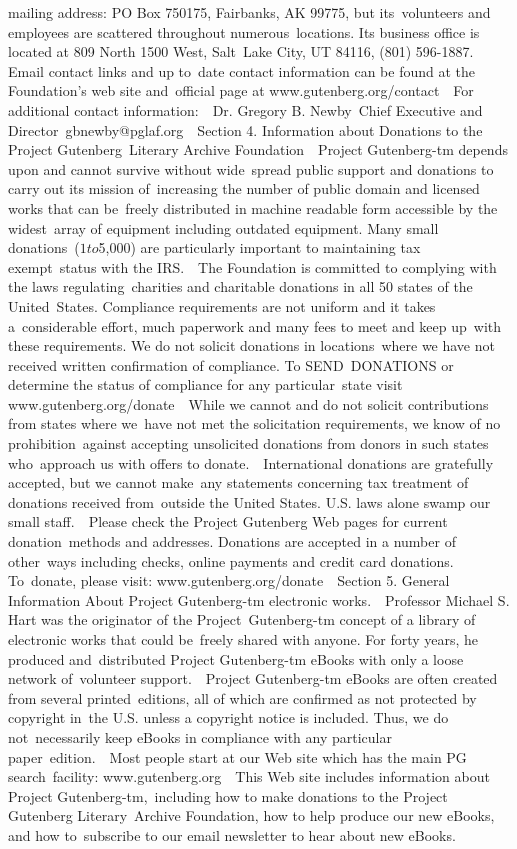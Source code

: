{mailing address: PO Box 750175, Fairbanks, AK 99775, but its\
volunteers and employees are scattered throughout numerous\
locations. Its business office is located at 809 North 1500 West, Salt\
Lake City, UT 84116, (801) 596-1887. Email contact links and up to\
date contact information can be found at the Foundation's web site and\
official page at www.gutenberg.org/contact\
\
For additional contact information:\
\
    Dr. Gregory B. Newby\
    Chief Executive and Director\
    gbnewby@pglaf.org\
\
Section 4. Information about Donations to the Project Gutenberg\
Literary Archive Foundation\
\
Project Gutenberg-tm depends upon and cannot survive without wide\
spread public support and donations to carry out its mission of\
increasing the number of public domain and licensed works that can be\
freely distributed in machine readable form accessible by the widest\
array of equipment including outdated equipment. Many small donations\
($1 to $5,000) are particularly important to maintaining tax exempt\
status with the IRS.\
\
The Foundation is committed to complying with the laws regulating\
charities and charitable donations in all 50 states of the United\
States. Compliance requirements are not uniform and it takes a\
considerable effort, much paperwork and many fees to meet and keep up\
with these requirements. We do not solicit donations in locations\
where we have not received written confirmation of compliance. To SEND\
DONATIONS or determine the status of compliance for any particular\
state visit www.gutenberg.org/donate\
\
While we cannot and do not solicit contributions from states where we\
have not met the solicitation requirements, we know of no prohibition\
against accepting unsolicited donations from donors in such states who\
approach us with offers to donate.\
\
International donations are gratefully accepted, but we cannot make\
any statements concerning tax treatment of donations received from\
outside the United States. U.S. laws alone swamp our small staff.\
\
Please check the Project Gutenberg Web pages for current donation\
methods and addresses. Donations are accepted in a number of other\
ways including checks, online payments and credit card donations. To\
donate, please visit: www.gutenberg.org/donate\
\
Section 5. General Information About Project Gutenberg-tm electronic works.\
\
Professor Michael S. Hart was the originator of the Project\
Gutenberg-tm concept of a library of electronic works that could be\
freely shared with anyone. For forty years, he produced and\
distributed Project Gutenberg-tm eBooks with only a loose network of\
volunteer support.\
\
Project Gutenberg-tm eBooks are often created from several printed\
editions, all of which are confirmed as not protected by copyright in\
the U.S. unless a copyright notice is included. Thus, we do not\
necessarily keep eBooks in compliance with any particular paper\
edition.\
\
Most people start at our Web site which has the main PG search\
facility: www.gutenberg.org\
\
This Web site includes information about Project Gutenberg-tm,\
including how to make donations to the Project Gutenberg Literary\
Archive Foundation, how to help produce our new eBooks, and how to\
subscribe to our email newsletter to hear about new eBooks.\
}